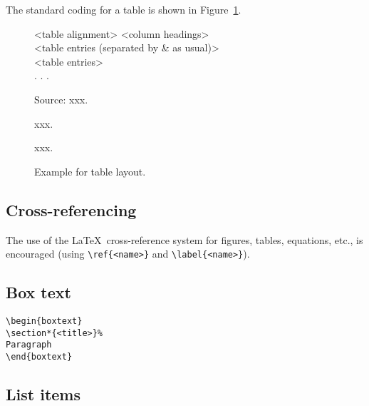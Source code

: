 \documentclass[AMS,STIX1COL]{WileyNJD-v2}
\begin{document}
The standard coding for a table is shown in Figure~\ref{F2}.

\begin{figure}[h]
\setlength{\fboxsep}{0pt}%
\setlength{\fboxrule}{0pt}%
\begin{center}
\begin{boxedverbatim}
\begin{table}
\caption{<Table caption>}
\centering
\begin{tabular}{<table alignment>}
\toprule
<column headings>\\
\midrule
<table entries
(separated by & as usual)>\\
<table entries>\\
.
.
.\\
\bottomrule
\end{tabular}
\begin{tablenotes}
\item Source: xxx.
\item[1] xxx.
\item[2] xxx.
\end{tablenotes}
\end{table}
\end{boxedverbatim}
\end{center}
\caption{Example for table layout.\label{F2}}
\end{figure}

\subsection{Cross-referencing}
The use of the \LaTeX\ cross-reference system
for figures, tables, equations, etc., is encouraged
(using \verb"\ref{<name>}" and \verb"\label{<name>}").

\subsection{Box text}

\begin{verbatim}
\begin{boxtext}
\section*{<title>}%
Paragraph
\end{boxtext}
\end{verbatim}

\subsection{List items}
\end{document}
